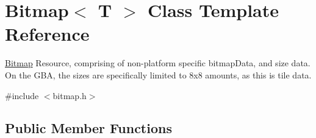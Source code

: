\hypertarget{class_bitmap}{\section{Bitmap$<$ T $>$ Class Template Reference}
\label{class_bitmap}
}


\hyperlink{class_bitmap}{Bitmap} Resource, comprising of non-\/platform specific bitmap\-Data, and size data. On the G\-B\-A, the sizes are specifically limited to 8x8 amounts, as this is tile data.  




{\ttfamily \#include $<$bitmap.\-h$>$}

\subsection*{Public Member Functions}
